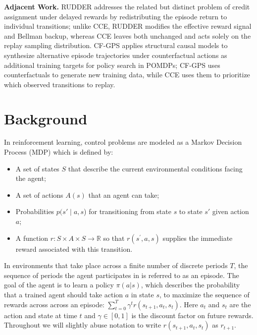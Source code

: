 \documentclass[conference]{IEEEtran}
\begin{document}
\noindent\textbf{Adjacent Work.}
RUDDER \cite{arjona2019rudder} addresses the related but distinct problem of credit assignment under delayed rewards by redistributing the episode return to individual transitions; unlike CCE, RUDDER modifies the effective reward signal and Bellman backup, whereas CCE leaves both unchanged and acts solely on the replay sampling distribution.
CF-GPS \cite{buesing2019woulda} applies structural causal models to synthesize alternative episode trajectories under counterfactual actions as additional training targets for policy search in POMDPs; CF-GPS uses counterfactuals to generate new training data, while CCE uses them to prioritize which observed transitions to replay.

\section{Background}
\noindent In reinforcement learning, control problems are modeled as a Markov Decision Process (MDP) \cite{bellman1957dynamic} which is defined by:
\begin{itemize}
\item A set of states $S$ that describe the current environmental conditions facing the agent;
\item A set of actions $A(s)$ that an agent can take;
\item Probabilities $p(s'\mid a,s$) for transitioning from state $s$ to state $s'$ given action $a$;
\item A function $r:S\times A\times S \to \mathbb{R}$ so that $r(s^{\prime},a,s)$ supplies the immediate reward associated with this transition.
\end{itemize} In environments that take place across a finite number of discrete periods $T$, the sequence of periods the agent participates in is referred to as an episode. The goal of the agent is to learn a policy $\pi(a|s)$, which describes the probability that a trained agent should take action $a$ in state $s$, to maximize the sequence of rewards across across an episode: $\sum_{t = 0}^T\gamma^tr(s_{t+1},a_t,s_t)$.  Here $a_t$ and $s_t$ are the action and state at time $t$ and $\gamma\in[0,1]$ is the discount factor on future rewards.  Throughout we will slightly abuse notation to write $r(s_{t+1},a_t,s_t)$ as $r_{t+1}$.

\end{document}
